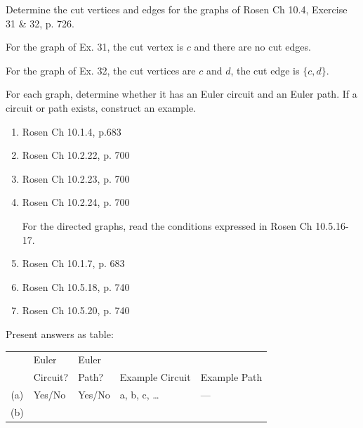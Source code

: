 \begin{questions}
 Determine the cut vertices and edges for the graphs of Rosen Ch 10.4, Exercise 31 \& 32, p. 726.
    \ifprintanswers
        \vspace{-10pt}
    \fi
    \begin{solution}
        For the graph of Ex. 31, the cut vertex is $c$ and there are no cut edges. 

        For the graph of Ex. 32, the cut vertices are $c$ and $d$, the cut edge is $\{c, d\}$.
    \end{solution} 
    




  For each graph, determine whether it has an Euler circuit and an Euler path.  If a circuit or path exists, construct an example.
\begin{enumerate}[label=(\alph*), topsep=0pt, itemsep=0pt, parsep=0pt]
    \item Rosen Ch 10.1.4, p.683
    \item Rosen Ch 10.2.22, p. 700
    \item Rosen Ch 10.2.23, p. 700
    \item Rosen Ch 10.2.24, p. 700

    For the directed graphs, read the conditions expressed in Rosen Ch 10.5.16-17.  
    \item Rosen Ch 10.1.7, p. 683
    \item Rosen Ch 10.5.18, p. 740
    \item Rosen Ch 10.5.20, p. 740

\end{enumerate}

\ifprintanswers 
\else
Present answers as table: 

\begin{tabular}{|c||l|l||l|l|}
    \hline 
          & Euler & Euler &  & \\
          & Circuit? & Path? & Example Circuit & Example Path \\
    \hline 
        (a) & Yes/No & Yes/No & a, b, c, \ldots \hspace*{0.8in}  & --- \hspace*{1in} \\
    \hline 
        (b) & & & & \\
    \hline 
\end{tabular}
\fi


\end{questions}
